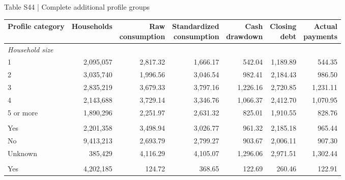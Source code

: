 \documentclass[10pt]{article}
\begin{document}
\clearpage
\begin{center}\begin{minipage}{\textwidth}\fontsize{7.7}{9.3}\selectfont
Table S44 | Complete additional profile groups
\par\vspace{4pt}
\begin{tabularx}{\textwidth}{@{}Xrrrrrr@{}}\toprule
Profile category & Households & \shortstack[r]{Raw\\consumption} & \shortstack[r]{Standardized\\consumption} & \shortstack[r]{Cash\\drawdown} & \shortstack[r]{Closing\\debt} & \shortstack[r]{Actual\\payments} \\
\midrule
\multicolumn{7}{l}{\textit{Household size}} \\

1 & 2,095,057 & 2,817.32 & 1,666.17 & 542.04 & 1,189.89 & 544.35 \\

2 & 3,035,740 & 1,996.56 & 3,046.54 & 982.41 & 2,184.43 & 986.50 \\

3 & 2,835,219 & 3,679.33 & 3,797.16 & 1,226.16 & 2,720.85 & 1,231.11 \\

4 & 2,143,688 & 3,729.14 & 3,346.76 & 1,066.37 & 2,412.70 & 1,070.95 \\

5 or more & 1,890,296 & 2,251.97 & 2,631.32 & 825.01 & 1,910.55 & 828.76 \\

\addlinespace[3pt]
\multicolumn{7}{l}{\textit{Child under 18}} \\

Yes & 2,201,358 & 3,498.94 & 3,026.77 & 961.32 & 2,185.18 & 965.44 \\

No & 9,413,213 & 2,693.79 & 2,799.27 & 903.67 & 2,006.11 & 907.30 \\

Unknown & 385,429 & 4,116.29 & 4,105.07 & 1,296.06 & 2,971.51 & 1,302.44 \\

\addlinespace[3pt]
\multicolumn{7}{l}{\textit{Member aged 65+}} \\

Yes & 4,202,185 & 124.72 & 368.65 & 122.69 & 260.46 & 122.91 \\


\end{tabularx}
\end{minipage}
\end{center}
\end{document}
